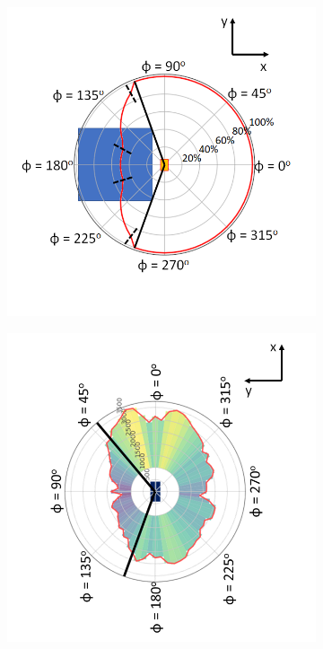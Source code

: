 \begin{figure}[!h]
\centering
\begin{subfigure}{.5\textwidth}
  \centering
  \includegraphics[width=\linewidth]{Chapter6/Figs/Raster/expectedCubeAttenuation.png}
  \captionsetup{width=.9\linewidth}
  \caption{}
  \label{subFig:expectedCubeAttenuation}
\end{subfigure}%
\begin{subfigure}{.5\textwidth}
  \centering
\includegraphics[width=\linewidth]{Chapter6/Figs/Raster/measuredWylfaAttenuation.png}

\end{subfigure}
\end{figure}
